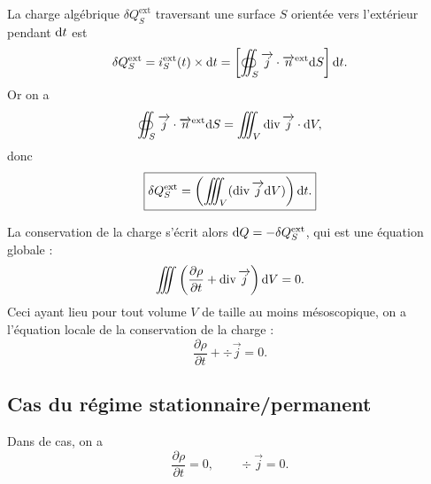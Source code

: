         La charge algébrique $\delta Q_{S}^{\text{ext}}$ traversant une surface $S$ orientée vers l'extérieur pendant $\mathrm{d} t$ est 
        \begin{equation*}
            \delta Q_S^{\text{ext}}=i_{S}^{\text{ext}}(t)\times\mathrm{d} t=\left[
                \oiint_{S}\protect\overrightarrow{{j}}\cdot\protect\overrightarrow{{n}}^{\text{ext}}\mathrm{d} S
            \right]\mathrm{d} t.
        \end{equation*}
        Or on a 
        \begin{equation*}
            \oiint_{S}\protect\overrightarrow{{j}}\cdot\protect\overrightarrow{{n}}^{\text{ext}}\mathrm{d} S=\iiint_{V}\operatorname{div}\protect\overrightarrow{{j}}\cdot\mathrm{d} V,
        \end{equation*}
        donc
        \begin{equation*}
            \boxed{
                \delta Q_S^{\text{ext}}=\left(
                    \iiint_{V}(\operatorname{div}\protect\overrightarrow{{j}}\mathrm{d} V)
                \right)\mathrm{d} t.
            }
        \end{equation*}

        La conservation de la charge s'écrit alors $\mathrm{d} Q=-\delta Q_S^{\text{ext}}$, qui est une équation globale :
        \begin{equation*}
            \iiint\left(\frac{\partial\rho}{\partial t}+\operatorname{div}\protect\overrightarrow{{j}}\right)\mathrm{d} V=0.
        \end{equation*}
        Ceci ayant lieu pour tout volume $V$ de taille au moins mésoscopique, on a l'équation locale de la conservation de la charge :
        \begin{equation*}
            \boxed{
                \frac{\partial\rho}{\partial t}+\div\vec{j}=0.
            }
        \end{equation*}

    \subsection{Cas du régime stationnaire/permanent}

        Dans de cas, on a 
        \begin{equation*}
            \boxed{
                \dfrac{\partial\rho}{\partial t}=0,\qquad\div\vec{j}=0.
            }
        \end{equation*}

